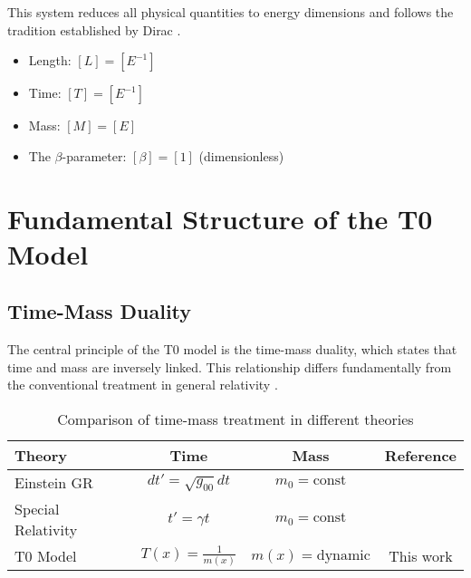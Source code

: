 \documentclass[12pt,a4paper]{article}
\begin{document}
	This system reduces all physical quantities to energy dimensions and follows the tradition established by Dirac \citep{dirac1958}.
	
	\begin{tcolorbox}[colback=blue!5!white,colframe=blue!75!black,title=Dimensions in Natural Units]
		\begin{itemize}
			\item Length: $[L] = [E^{-1}]$
			\item Time: $[T] = [E^{-1}]$ 
			\item Mass: $[M] = [E]$
			\item The $\beta$-parameter: $[\beta] = [1]$ (dimensionless)
		\end{itemize}
	\end{tcolorbox}
	
	\section{Fundamental Structure of the T0 Model}
	\label{sec:fundamental_structure}
	
	\subsection{Time-Mass Duality}
	\label{subsec:time_mass_duality}
	
	The central principle of the T0 model is the time-mass duality, which states that time and mass are inversely linked. This relationship differs fundamentally from the conventional treatment in general relativity \citep{einstein1915,misner1973}.
	
	\begin{table}[htbp]
		\centering
		\begin{tabular}{|l|c|c|c|}
			\hline
			\textbf{Theory} & \textbf{Time} & \textbf{Mass} & \textbf{Reference} \\
			\hline
			Einstein GR & $dt' = \sqrt{g_{00}} dt$ & $m_0 = \text{const}$ & \citep{einstein1915,misner1973} \\
			Special Relativity & $t' = \gamma t$ & $m_0 = \text{const}$ & \citep{einstein1905} \\
			T0 Model & $T(x) = \frac{1}{m(x)}$ & $m(x) = \text{dynamic}$ & This work \\
			\hline
		\end{tabular}
		\caption{Comparison of time-mass treatment in different theories}
		\label{tab:theory_comparison}
	\end{table}
	
\end{document}
